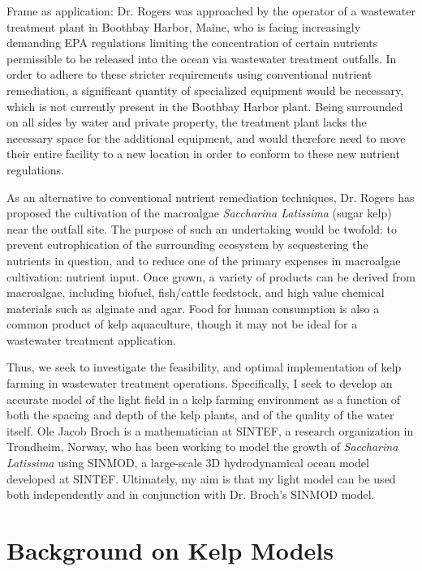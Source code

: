 Frame as application: Dr. Rogers was approached by the operator of a wastewater treatment plant in Boothbay Harbor, Maine, who is facing increasingly demanding EPA regulations limiting the concentration of certain nutrients permissible to be released into the ocean via wastewater treatment outfalls.
In order to adhere to these stricter requirements using conventional nutrient remediation, a significant quantity of specialized equipment would be necessary, which is not currently present in the Boothbay Harbor plant.
Being surrounded on all sides by water and private property, the treatment plant lacks the necessary space for the additional equipment, and would therefore need to move their entire facility to a new location in order to conform to these new nutrient regulations.

As an alternative to conventional nutrient remediation techniques, Dr. Rogers has proposed the cultivation of the macroalgae \textit{Saccharina Latissima} (sugar kelp) near the outfall site.
The purpose of such an undertaking would be twofold: to prevent eutrophication of the surrounding ecosystem by sequestering the nutrients in question, and to reduce one of the primary expenses in macroalgae cultivation: nutrient input.
Once grown, a variety of products can be derived from macroalgae, including biofuel, fish/cattle feedstock, and high value chemical materials such as alginate and agar.
Food for human consumption is also a common product of kelp aquaculture, though it may not be ideal for a wastewater treatment application.

Thus, we seek to investigate the feasibility, and optimal implementation of kelp farming in wastewater treatment operations. 
Specifically, I seek to develop an accurate model of the light field in a kelp farming environment as a function of both the spacing and depth of the kelp plants, and of the quality of the water itself.
Ole Jacob Broch is a mathematician at SINTEF, a research organization in Trondheim, Norway, who has been working to model the growth of \textit{Saccharina Latissima} using SINMOD, a large-scale 3D hydrodynamical ocean model developed at SINTEF.
Ultimately, my aim is that my light model can be used both independently and in conjunction with Dr. Broch's SINMOD model.

\section{Background on Kelp Models}

